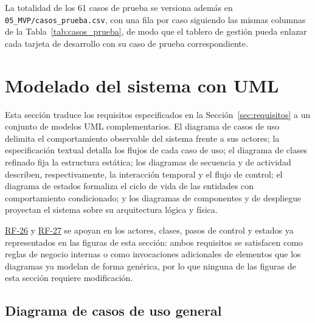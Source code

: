 \documentclass[journal,onecolumn]{IEEEtran}
\begin{document}
\begin{landscape}
\begin{longtable}{@{}p{1.3cm} p{1.3cm} p{4.6cm} p{3.6cm} p{5.2cm} p{1.6cm}@{}}
		\end{longtable}
	\end{landscape}

	La totalidad de los 61 casos de prueba se versiona además en
	\texttt{05\_MVP/casos\_prueba.csv}, con una fila por caso siguiendo las
	mismas columnas de la Tabla~\ref{tab:casos_prueba}, de modo que el
	tablero de gestión pueda enlazar cada tarjeta de desarrollo con su caso
	de prueba correspondiente.


	
	\section{Modelado del sistema con UML}
	\label{sec:uml}
	
	Esta sección traduce los requisitos especificados en la
	Sección~\ref{sec:requisitos} a un conjunto de modelos UML complementarios.
	El diagrama de casos de uso delimita el comportamiento observable del
	sistema frente a sus actores; la especificación textual detalla los flujos
	de cada caso de uso; el diagrama de clases refinado fija la estructura
	estática; los diagramas de secuencia y de actividad describen,
	respectivamente, la interacción temporal y el flujo de control; el diagrama
	de estados formaliza el ciclo de vida de las entidades con comportamiento
	condicionado; y los diagramas de componentes y de despliegue proyectan el
	sistema sobre su arquitectura lógica y física.
	
	\hyperref[tab:RF-26]{RF-26} y \hyperref[tab:RF-27]{RF-27} se apoyan en los actores, clases, pasos de control y
	estados ya representados en las figuras de esta sección: ambos
	requisitos se satisfacen como reglas de negocio internas o como
	invocaciones adicionales de elementos que los diagramas ya modelan de forma
	genérica, por lo que ninguna de las figuras de esta sección requiere
	modificación.
	
	\subsection{Diagrama de casos de uso general}
	\label{sec:cu-general}
\end{document}
